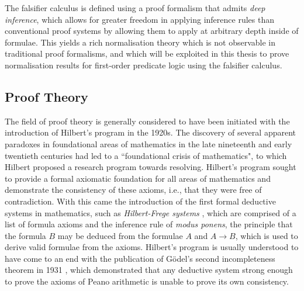 \documentclass[10pt]{article}
\theoremstyle{definition}\newtheorem{remark}[theorem]{Remark}
\theoremstyle{definition}\newtheorem{example}[theorem]{Example}
\theoremstyle{definition}\newtheorem{definition}[theorem]{Definition}
\begin{document}
	The falsifier calculus is defined using a proof formalism that admits \textit{deep inference}, which allows for greater freedom in applying inference rules than conventional proof systems by allowing them to apply at arbitrary depth inside of formulae. This yields a rich normalisation theory which is not observable in traditional proof formalisms, and which will be exploited in this thesis to prove normalisation results for first-order predicate logic using the falsifier calculus.
	
	\subsection{Proof Theory}
	
	The field of proof theory is generally considered to have been initiated with the introduction of Hilbert's program in the 1920s. The discovery of several apparent paradoxes in foundational areas of mathematics in the late nineteenth and early twentieth centuries had led to a ``foundational crisis of mathematics", to which Hilbert proposed a research program towards resolving. Hilbert's program sought to provide a formal axiomatic foundation for all areas of mathematics and demonstrate the consistency of these axioms, i.e., that they were free of contradiction. With this came the introduction of the first formal deductive systems in mathematics, such as \textit{Hilbert-Frege systems} \cite{CookReckhowFregeSystems}, which are comprised of a list of formula axioms and the inference rule of \textit{modus ponens}, the principle that the formula $B$ may be deduced from the formulae $A$ and $A \rightarrow B$, which is used to derive valid formulae from the axioms. Hilbert's program is usually understood to have come to an end with the publication of Gödel's second incompleteness theorem in 1931 \cite{GodelIncompletenessTheorems}, which demonstrated that any deductive system strong enough to prove the axioms of Peano arithmetic is unable to prove its own consistency.
	
\end{document}
